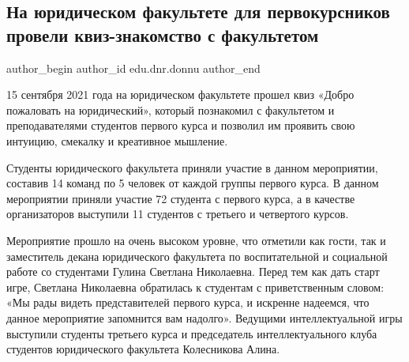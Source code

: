  
 
 
 
 
\subsection{На юридическом факультете для первокурсников провели квиз-знакомство с факультетом}
\label{sec:17_09_2021.stz.edu.dnr.donnu.1.kviz_znakomstvo_juristy}
 
\ifcmt
 author_begin
   author_id edu.dnr.donnu
 author_end
\fi

15 сентября 2021 года на юридическом факультете прошел квиз «Добро пожаловать
на юридический», который познакомил с факультетом и преподавателями студентов
первого курса и позволил им проявить свою интуицию, смекалку и креативное
мышление.


Студенты юридического факультета приняли участие в данном мероприятии, составив
14 команд по 5 человек от каждой группы первого курса. В данном мероприятии
приняли участие 72 студента с первого курса, а в качестве организаторов
выступили 11 студентов с третьего и четвертого курсов.


Мероприятие прошло на очень высоком уровне, что отметили как гости, так и
заместитель декана юридического факультета по воспитательной и социальной
работе со студентами Гулина Светлана Николаевна. Перед тем как дать старт игре,
Светлана Николаевна обратилась к студентам с приветственным словом: «Мы рады
видеть представителей первого курса, и искренне надеемся, что данное
мероприятие запомнится вам надолго». Ведущими интеллектуальной игры выступили
студенты третьего курса и председатель интеллектуального клуба студентов
юридического факультета Колесникова Алина.

